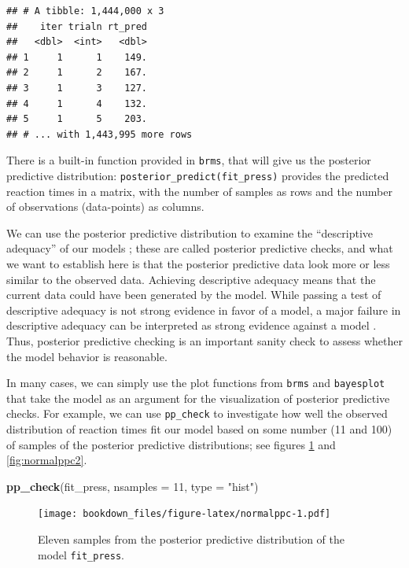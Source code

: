 \documentclass[12pt,]{krantz}
\newenvironment{Shaded}{\begin{snugshade}}{\end{snugshade}}
\newcommand{\KeywordTok}[1]{\textcolor[rgb]{0.13,0.29,0.53}{\textbf{#1}}}
\newcommand{\DataTypeTok}[1]{\textcolor[rgb]{0.13,0.29,0.53}{#1}}
\newcommand{\DecValTok}[1]{\textcolor[rgb]{0.00,0.00,0.81}{#1}}
\newcommand{\StringTok}[1]{\textcolor[rgb]{0.31,0.60,0.02}{#1}}
\newcommand{\NormalTok}[1]{#1}
\theoremstyle{definition}
\theoremstyle{definition}
\theoremstyle{definition}
\theoremstyle{remark}
\begin{document}
\begin{verbatim}
## # A tibble: 1,444,000 x 3
##    iter trialn rt_pred
##   <dbl>  <int>   <dbl>
## 1     1      1    149.
## 2     1      2    167.
## 3     1      3    127.
## 4     1      4    132.
## 5     1      5    203.
## # ... with 1,443,995 more rows
\end{verbatim}

There is a built-in function provided in \texttt{brms}, that will give
us the posterior predictive distribution:
\texttt{posterior\_predict(fit\_press)} provides the predicted reaction
times in a matrix, with the number of samples as rows and the number of
observations (data-points) as columns.

We can use the posterior predictive distribution to examine the
``descriptive adequacy'' of our models \citetext{\citealp[Chapter
6]{Gelman14}; \citealp{shiffrinSurveyModelEvaluation2008}}; these are
called posterior predictive checks, and what we want to establish here
is that the posterior predictive data look more or less similar to the
observed data. Achieving descriptive adequacy means that the current
data could have been generated by the model. While passing a test of
descriptive adequacy is not strong evidence in favor of a model, a major
failure in descriptive adequacy can be interpreted as strong evidence
against a model \citep{shiffrinSurveyModelEvaluation2008}. Thus,
posterior predictive checking is an important sanity check to assess
whether the model behavior is reasonable.

In many cases, we can simply use the plot functions from \texttt{brms}
and \texttt{bayesplot} that take the model as an argument for the
visualization of posterior predictive checks. For example, we can use
\texttt{pp\_check} to investigate how well the observed distribution of
reaction times fit our model based on some number (11 and 100) of
samples of the posterior predictive distributions; see figures
\ref{fig:normalppc} and \ref{fig:normalppc2}.




\begin{Shaded}
\begin{Highlighting}[]
\KeywordTok{pp_check}\NormalTok{(fit_press, }\DataTypeTok{nsamples =} \DecValTok{11}\NormalTok{, }\DataTypeTok{type =} \StringTok{"hist"}\NormalTok{)}
\end{Highlighting}
\end{Shaded}

\begin{figure}
\centering
\texttt{[image: bookdown\_files/figure-latex/normalppc-1.pdf]}
\caption{\label{fig:normalppc}Eleven samples from the posterior predictive
distribution of the model \texttt{fit\_press}.}
\end{figure}
\end{document}
